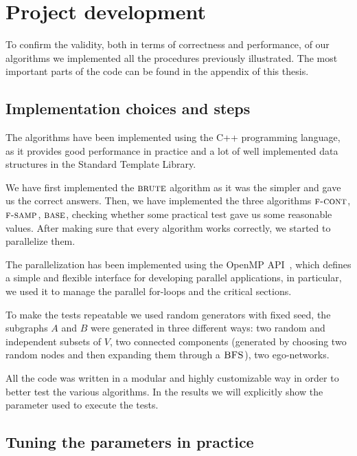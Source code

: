 \chapter{Project development}

To confirm the validity, both in terms of correctness and performance, of our algorithms we implemented all the procedures previously illustrated. 
The most important parts of the code can be found in the appendix of this thesis.

\section{Implementation choices and steps}

The algorithms have been implemented using the C++ programming language, 
as it provides good performance in practice and a lot of well implemented data structures in the Standard Template Library.\medskip

We have first implemented the $\textsc{brute}$ algorithm as it was the simpler and gave us the correct answers. Then, we have implemented the three algorithms $\textsc{f-cont}$, $\textsc{f-samp}$, $\textsc{base}$, checking whether some practical test gave us some reasonable values.
After making sure that every algorithm works correctly, we started to parallelize them.\medskip

The parallelization has been implemented using the OpenMP API~\cite{openmp}, which defines a simple and flexible interface for developing parallel applications, in particular, we used it to manage the parallel for-loops and the critical sections.\medskip

To make the tests repeatable we used random generators with fixed seed, the subgraphs $A$ and $B$ were generated in three different ways: two random and independent subsets of $V$, two connected components (generated by choosing two random nodes and then expanding them through a $\textsc{BFS}$), two ego-networks.\medskip

All the code was written in a modular and highly customizable way in order
to better test the various algorithms. In the results we will explicitly show the parameter used to execute the tests.

\clearpage

\section{Tuning the parameters in practice}

